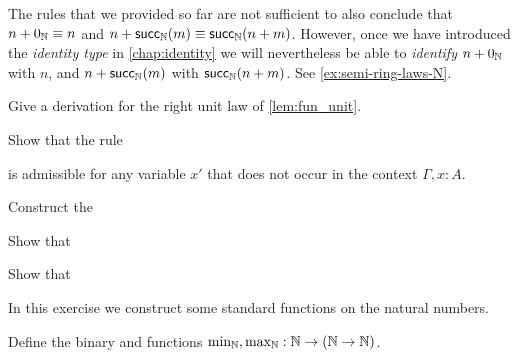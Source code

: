 \begin{rmk}
The rules that we provided so far are not sufficient to also conclude that $n+\zeroN\jdeq n$ and $n+ \succN(m)\jdeq \succN(n+m)$. However, once we have introduced the \emph{identity type} in \cref{chap:identity} we will nevertheless be able to \emph{identify} $n+\zeroN$ with $n$, and $n+ \succN(m)$ with $\succN(n+m)$. See \cref{ex:semi-ring-laws-N}. 
\end{rmk}

\begin{exercises}
\item \label{ex:fun_right_unit}Give a derivation for the right unit law of \autoref{lem:fun_unit}.
\item Show that the rule
\begin{prooftree}
\end{prooftree}
is admissible for any variable $x'$ that does not occur in the context $\Gamma,x:A$.
\item 
  \begin{subexenum}
  \item Construct the 
    \begin{prooftree}
    \end{prooftree}
  \item Show that
    \begin{prooftree}
    \end{prooftree}
  \item Show that
    \begin{prooftree}
    \end{prooftree}
  \end{subexenum}
\item In this exercise we construct some standard functions on the natural numbers.
  \begin{subexenum}
  \item Define the binary  and  functions $\min_\N,\max_\N:\N\to(\N\to\N)$.

\end{subexenum}
\end{exercises}
